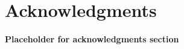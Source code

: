 \section{Acknowledgments}\label{sec:acknowledgements}

\textbf{Placeholder for acknowledgments section}

